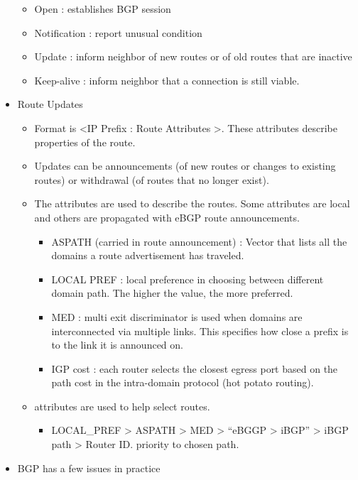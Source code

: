 \begin{itemize}
  \begin{itemize}
  \tightlist
  \item
    Open : establishes BGP session
  \item
    Notification : report unusual condition
  \item
    Update : inform neighbor of new routes or of old routes that are
    inactive
  \item
    Keep-alive : inform neighbor that a connection is still viable.
  \end{itemize}
\item
  Route Updates

  \begin{itemize}
  \tightlist
  \item
    Format is \textless{}IP Prefix : Route Attributes \textgreater{}.
    These attributes describe properties of the route.
  \item
    Updates can be announcements (of new routes or changes to existing
    routes) or withdrawal (of routes that no longer exist).
  \item
    The attributes are used to describe the routes. Some attributes are
    local and others are propagated with eBGP route announcements.

    \begin{itemize}
    \tightlist
    \item
      ASPATH (carried in route announcement) : Vector that lists all the
      domains a route advertisement has traveled.
    \item
      LOCAL PREF : local preference in choosing between different domain
      path. The higher the value, the more preferred.
    \item
      MED : multi exit discriminator is used when domains are
      interconnected via multiple links. This specifies how close a
      prefix is to the link it is announced on.
    \item
      IGP cost : each router selects the closest egress port based on
      the path cost in the intra-domain protocol (hot potato routing).
    \end{itemize}
  \item
    attributes are used to help select routes.

    \begin{itemize}
    \tightlist
    \item
      LOCAL\_PREF \textgreater{} ASPATH \textgreater{} MED
      \textgreater{} ``eBGGP \textgreater{} iBGP'' \textgreater{} iBGP
      path \textgreater{} Router ID. priority to chosen path.
    \end{itemize}
  \end{itemize}
\item
  BGP has a few issues in practice


\end{itemize}
